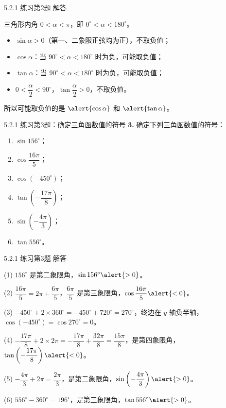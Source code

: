 \documentclass[10pt,aspectratio=169,serif]{beamer}
\begin{document}
\begin{frame}[t]{5.2.1 练习第2题 解答}
\begin{tcolorbox}[colback=orange!10,colframe=orange,title=\textbf{解}]
三角形内角 $0<\alpha<\pi$，即 $0^\circ<\alpha<180^\circ$。

\vspace{0.5em}
\begin{itemize}
  \item $\sin\alpha>0$（第一、二象限正弦均为正），不取负值；
  \item $\cos\alpha$：当 $90^\circ<\alpha<180^\circ$ 时为负，\alert{可能取负值}；
  \item $\tan\alpha$：当 $90^\circ<\alpha<180^\circ$ 时为负，\alert{可能取负值}；
  \item $0<\dfrac{\alpha}{2}<90^\circ$，$\tan\dfrac{\alpha}{2}>0$，不取负值。
\end{itemize}
\vspace{0.5em}
所以可能取负值的是 $\alert{\cos\alpha}$ 和 $\alert{\tan\alpha}$。
\end{tcolorbox}
\end{frame}

\begin{frame}[t]{5.2.1 练习第3题：确定三角函数值的符号}
\textbf{3.} 确定下列三角函数值的符号：
\begin{enumerate}
  \item $\sin 156^\circ$；
  \item $\cos\dfrac{16\pi}{5}$；
  \item $\cos(-450^\circ)$；
  \item $\tan\left(-\dfrac{17\pi}{8}\right)$；
  \item $\sin\left(-\dfrac{4\pi}{3}\right)$；
  \item $\tan 556^\circ$。
\end{enumerate}
\end{frame}

\begin{frame}[t]{5.2.1 练习第3题 解答}
\begin{tcolorbox}[colback=orange!10,colframe=orange,title=\textbf{解}]
\small
(1) $156^\circ$ 是第二象限角，$\sin 156^\circ \alert{>0}$。

(2) $\dfrac{16\pi}{5}=2\pi+\dfrac{6\pi}{5}$，$\dfrac{6\pi}{5}$ 是第三象限角，$\cos\dfrac{16\pi}{5}\alert{<0}$。

(3) $-450^\circ+2\times 360^\circ=-450^\circ+720^\circ=270^\circ$，终边在 $y$ 轴负半轴，$\cos(-450^\circ)=\cos 270^\circ=0$。

(4) $-\dfrac{17\pi}{8}+2\times 2\pi=-\dfrac{17\pi}{8}+\dfrac{32\pi}{8}=\dfrac{15\pi}{8}$，是第四象限角，$\tan\left(-\dfrac{17\pi}{8}\right)\alert{<0}$。

(5) $-\dfrac{4\pi}{3}+2\pi=\dfrac{2\pi}{3}$，是第二象限角，$\sin\left(-\dfrac{4\pi}{3}\right)\alert{>0}$。

(6) $556^\circ-360^\circ=196^\circ$，是第三象限角，$\tan 556^\circ\alert{>0}$。
\end{tcolorbox}
\end{frame}
\end{document}
